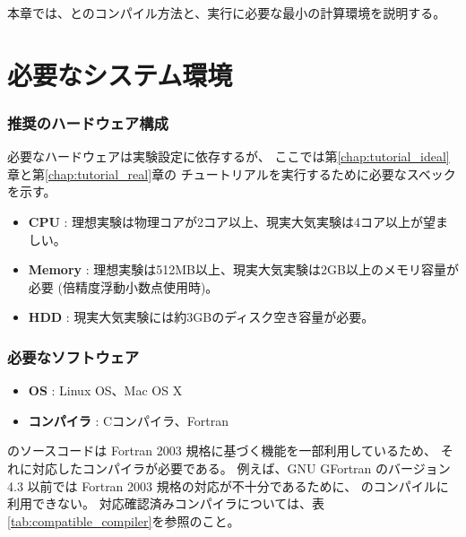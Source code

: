
本章では、\scalelib と\scalerm のコンパイル方法と、実行に必要な最小の計算環境を説明する。

\section{必要なシステム環境} \label{sec:req_env}
\subsubsection{\bf 推奨のハードウェア構成}

必要なハードウェアは実験設定に依存するが、
ここでは第\ref{chap:tutorial_ideal}章と第\ref{chap:tutorial_real}章の
チュートリアルを実行するために必要なスベックを示す。

  \begin{itemize}
    \item {\bf CPU} : 理想実験は物理コアが2コア以上、現実大気実験は4コア以上が望ましい。
    \item {\bf Memory} : 理想実験は512MB以上、現実大気実験は2GB以上のメモリ容量が必要 (倍精度浮動小数点使用時)。
    \item {\bf HDD} : 現実大気実験には約3GBのディスク空き容量が必要。
  \end{itemize}

\subsubsection{\bf 必要なソフトウェア}
  \begin{itemize}
  \item {\bf OS} : Linux OS、Mac OS X
  \item {\bf コンパイラ} : Cコンパイラ、Fortran
  \end{itemize}

  \scalelib のソースコードは Fortran 2003 規格に基づく機能を一部利用しているため、
  それに対応したコンパイラが必要である。
  例えば、GNU GFortran のバージョン 4.3 以前では Fortran 2003 規格の対応が不十分であるために、
  \scalelib のコンパイルに利用できない。
  対応確認済みコンパイラについては、表\ref{tab:compatible_compiler}を参照のこと。

